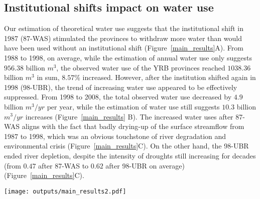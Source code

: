 
\subsection{Institutional shifts impact on water use}
\label{result-2}

\label{result-1-p2}
Our estimation of theoretical water use suggests that the institutional shift in 1987 (87-WAS) stimulated the provinces to withdraw more water than would have been used without an institutional shift (Figure~\ref{main_results}A).
From 1988 to 1998, on average, while the estimation of annual water use only suggests $956.38$ billion $m^3$, the observed water use of the YRB provinces reached $1038.36$ billion $m^3$ in sum, $8.57\%$ increased.
However, after the institution shifted again in 1998 (98-UBR), the trend of increasing water use appeared to be effectively suppressed. From 1998 to 2008, the total observed water use decreased by $4.9$ billion $m^3/yr$ per year, while the estimation of water use still suggests $10.3$ billion $m^3/yr$ increases (Figure~\ref{main_results} B).
The increased water uses after 87-WAS aligns with the fact that badly drying-up of the surface streamflow from 1987 to 1998, which was an obvious touchstone of river degradation and environmental crisis (Figure~\ref{main_results}C).
On the other hand, the 98-UBR ended river depletion, despite the intensity of droughts still increasing for decades (from $0.47$ after 87-WAS to $0.62$ after 98-UBR on average) (Figure~\ref{main_results}C).

\begin{figure*}[!tb]
    \centering
    \texttt{[image: outputs/main\_results2.pdf]}
    \caption{
        Effects of two institutional shifts on water resources use and allocation in the Yellow River Basin (YRB).
        \textbf{A.} water uses of the YRB before and after the institutional shift in 1987 (87-WAS);
        \textbf{B.} water uses of the YRB before and after the institutional shift in 1998 (98-UBR). While the blue lines are statistic water use data, the grey ones are the estimation from the Differenced Synthetic Control method with economic and environmental background controlled.
        \textbf{C.} Drought intensity in the YRB and drying up events of the Yellow River. The size of the grey bubbles denotes the length of a drying upstream.
    }
    \label{main_results}
\end{figure*}


